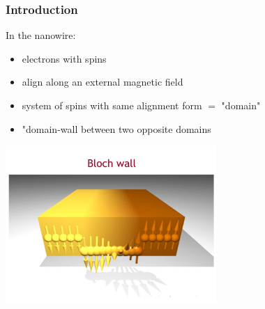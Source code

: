 \begin{frame}
	\frametitle{Introduction}
	In the nanowire:
	\begin{itemize}
	\item electrons with spins
	\item align along an external magnetic field 
	\item system of spins with same alignment form $=$ "domain"
	\item "domain-wall between two opposite domains
	\end{itemize}
	\begin{center}
	\includegraphics[width=0.6\textwidth]{../figs/bloch_wall.jpg}
	\end{center}
\end{frame}

